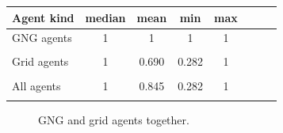 \begin{center}
  \begin{tabular}{l*{6}{c}r}
  Agent kind        & median & mean & min & max \\
  \hline
  GNG agents        & 1 & 1 & 1 & 1  \\   
                    & \\
  Grid agents       & 1 & 0.690                 & 0.282 & 1  \\  
                    &   & \color{green}{+0.006} & \color{red}{-0.002}  \\
  All agents        & 1 & 0.845               & 0.282 & 1  \\
                    &   & \color{red}{-0.05} & \color{red}{-0.002} \\
  \end{tabular}                                 
\end{center}




\begin{figure}[h!]
  \centering          
  \caption{GNG and grid agents together.}
\end{figure}